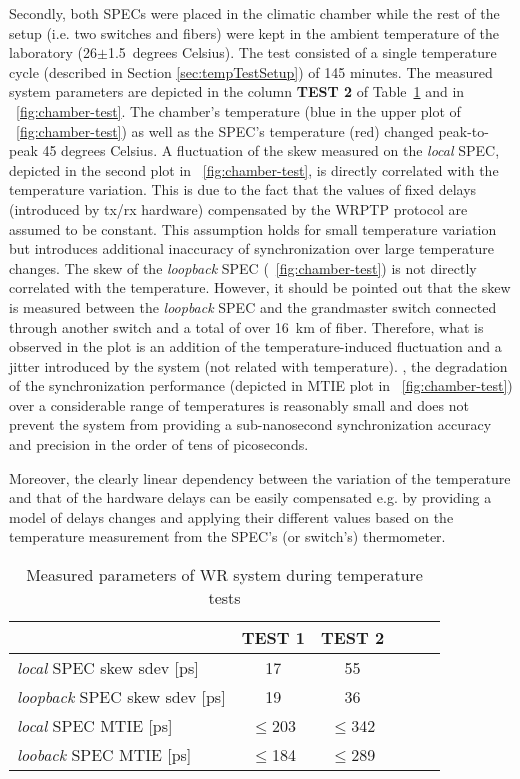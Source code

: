 Secondly, both SPECs were placed in the climatic chamber while the rest of the setup
(i.e. two switches and fibers) were kept in the ambient temperature of the laboratory
(26$\pm$1.5~degrees Celsius). The test consisted of a single temperature cycle (described in
Section \ref{sec:tempTestSetup}) of 145 minutes. The measured system parameters are depicted in the 
column \textbf{TEST 2} of Table~\ref{tab:dataCompare} and in \figurename~\ref{fig:chamber-test}. 
The chamber's temperature (blue in the upper plot of
\figurename~\ref{fig:chamber-test}) as well as the SPEC's temperature (red) changed peak-to-peak
45 degrees Celsius. A fluctuation of the skew measured on the \textit{local} SPEC, depicted in the 
second plot in \figurename~\ref{fig:chamber-test},
is directly correlated with the temperature variation. This is due to the fact that the values of 
fixed delays (introduced by tx/rx hardware) compensated by the WRPTP protocol are assumed 
to be constant. This assumption holds for small temperature variation but introduces additional 
inaccuracy of synchronization over large temperature changes.
The skew of the \textit{loopback} SPEC (\figurename~\ref{fig:chamber-test}) is not directly 
correlated with the temperature.
However, it should be pointed out that the skew is measured between the \textit{loopback} SPEC and the 
grandmaster switch connected through another switch and a total of over 16~km of fiber. Therefore, what is 
observed in the plot is an addition of 
the temperature-induced fluctuation and a jitter introduced by the system (not related with 
temperature). , the degradation
of the synchronization performance (depicted in MTIE plot in \figurename~\ref{fig:chamber-test}) 
over a considerable range of temperatures is reasonably small and does not prevent
the system from providing a sub-nanosecond synchronization accuracy and precision in the order of tens 
of picoseconds. 

Moreover, the clearly linear dependency between the variation of the temperature and that of the 
hardware delays can be easily compensated e.g. by providing a model of delays changes 
and applying their different values based on the temperature measurement from the SPEC's (or switch's) 
thermometer.


\begin{table}[!t]
\caption{Measured parameters of WR system during temperature tests}
\centering
\begin{tabular}{| l | c| c | c | c |c|}          \hline
                        &\textbf{TEST 1} & \textbf{TEST 2} \\   \hline
\textit{local} SPEC skew sdev [ps]    & 17             & 55              \\   \hline
\textit{loopback} SPEC skew sdev [ps] & 19             & 36              \\   \hline
\textit{local} SPEC MTIE         [ps] & $\leq$203            & $\leq$342             \\   \hline
\textit{looback} SPEC MTIE       [ps] & $\leq$184            & $\leq$289             \\   \hline
\end{tabular}
\label{tab:dataCompare}
\end{table} 

